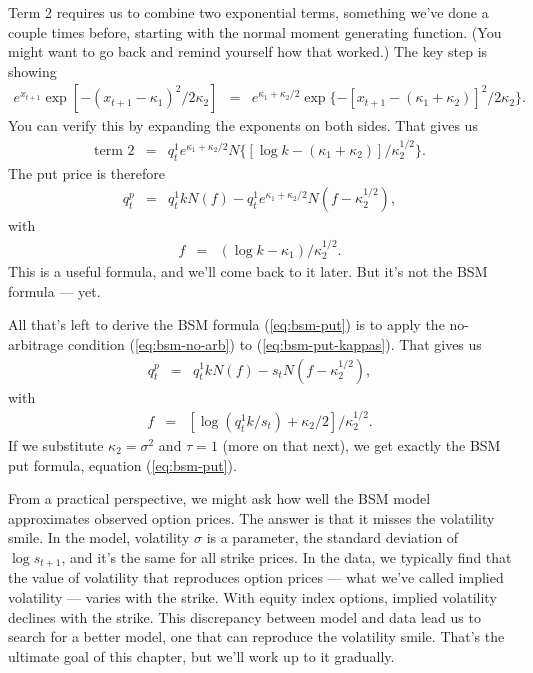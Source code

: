 \documentclass[11pt]{article}
\begin{document}
Term 2 requires us to combine two exponential terms, something
we've done a couple times before, starting with the normal
moment generating function.
(You might want to go back and remind yourself how that worked.)
The key step is showing
\begin{eqnarray*}
    e^{x_{t+1}} \exp[ - (x_{t+1} - \kappa_1)^2/2\kappa_2] &=&
        e^{\kappa_1 + \kappa_2/2} \exp\{ - [x_{t+1} - (\kappa_1+\kappa_2)]^2/2\kappa_2 \} .
\end{eqnarray*}
You can verify this by expanding the exponents on both sides.
That gives us
\begin{eqnarray*}
    \mbox{term 2} &=& q^1_t e^{\kappa_1 + \kappa_2/2}
            N \{ [\log k - (\kappa_1 + \kappa_2)]/\kappa_2^{1/2} \} .
\end{eqnarray*}
The put price is therefore
\begin{eqnarray}
    q^p_t &=& q^1_t k N (f) - q^1_t e^{\kappa_1 + \kappa_2/2}
            N ( f - \kappa_2^{1/2} ),
    \label{eq:bsm-put-kappas}
\end{eqnarray}
with
\begin{eqnarray*}
    f &=&  (\log k - \kappa_1)/\kappa_2^{1/2} .
\end{eqnarray*}
This is a useful formula, and we'll come back to it later.
But it's not the BSM formula --- yet.

All that's left to derive the BSM formula (\ref{eq:bsm-put})
is to apply the no-arbitrage condition (\ref{eq:bsm-no-arb})
to (\ref{eq:bsm-put-kappas}).
That gives us
\begin{eqnarray}
    q^p_t &=& q^1_t k N (f) - s_t N ( f - \kappa_2^{1/2} ),
    \label{eq:bsm-put-kappas-bsm}
\end{eqnarray}
with
\begin{eqnarray*}
    f &=&  [\log (q^1_t k/s_t) + \kappa_2/2]/\kappa_2^{1/2} .
\end{eqnarray*}
If we substitute $\kappa_2 = \sigma^2$ and $\tau = 1$ (more on that next),
we get exactly the BSM put formula, equation (\ref{eq:bsm-put}).

From a practical perspective, we might ask how well the BSM model
approximates observed option prices.
The answer is that it misses the volatility smile.
In the model, volatility $\sigma$ is a parameter, 
the standard deviation of $\log s_{t+1}$, 
and  it's the same for all strike prices.
In the data, we typically find that the value of volatility that reproduces
option prices --- what we've called implied volatility ---
varies with the strike.
With equity index options, implied volatility declines with the strike.
This discrepancy between model and data lead us to search
for a better model, one that can reproduce the volatility smile.
That's the ultimate goal of this chapter,
but we'll work up to it gradually.
\end{document}
